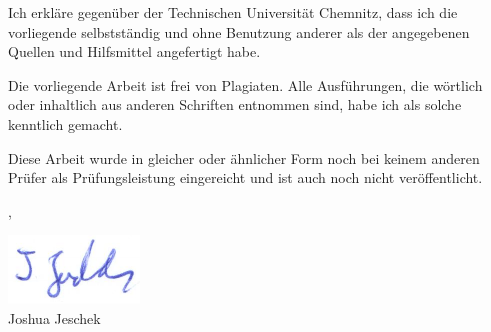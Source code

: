 \begin{tucerklaerung}
  \vspace{1em}\noindent
  Ich erkläre gegenüber der Technischen Universität Chemnitz, dass ich die vorliegende \thesistype{} selbstständig und ohne Benutzung anderer als der angegebenen Quellen und Hilfsmittel angefertigt habe.

  \vspace{1em}\noindent
  Die vorliegende Arbeit ist frei von Plagiaten. Alle Ausführungen, die wörtlich oder inhaltlich aus anderen Schriften entnommen sind, habe ich als solche kenntlich gemacht.

  \vspace{1em}\noindent
  Diese Arbeit wurde in gleicher oder ähnlicher Form noch bei keinem anderen Prüfer als Prüfungsleistung eingereicht und ist auch noch nicht veröffentlicht.


  \begin{flushright}
    \place, \makeatletter\@date\makeatother
  \end{flushright}
  \vspace{\baselineskip}
  \begin{flushright}
    \includegraphics[height=2.5\baselineskip]{assets/signature.pdf}\\
    Joshua Jeschek
  \end{flushright}
\end{tucerklaerung}

